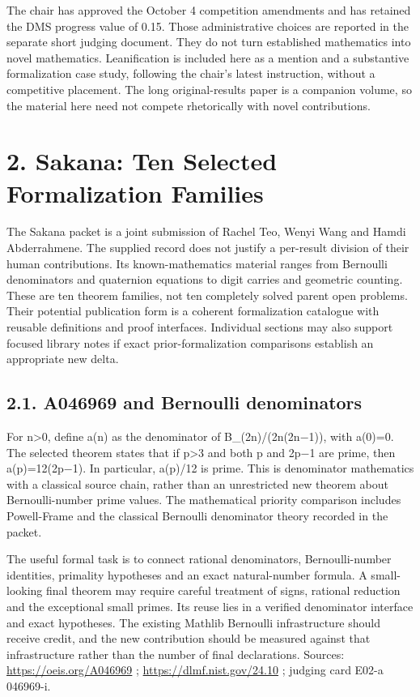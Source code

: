 \documentclass[11pt,a4paper]{article}
\begin{document}
The chair has approved the October 4 competition amendments and has retained the DMS progress value of 0.15. Those administrative choices are reported in the separate short judging document. They do not turn established mathematics into novel mathematics. Leanification is included here as a mention and a substantive formalization case study, following the chair's latest instruction, without a competitive placement. The long original-results paper is a companion volume, so the material here need not compete rhetorically with novel contributions.

\section{2. Sakana: Ten Selected Formalization Families}
The Sakana packet is a joint submission of Rachel Teo, Wenyi Wang and Hamdi Abderrahmene. The supplied record does not justify a per-result division of their human contributions. Its known-mathematics material ranges from Bernoulli denominators and quaternion equations to digit carries and geometric counting. These are ten theorem families, not ten completely solved parent open problems. Their potential publication form is a coherent formalization catalogue with reusable definitions and proof interfaces. Individual sections may also support focused library notes if exact prior-formalization comparisons establish an appropriate new delta.

\subsection{2.1. A046969 and Bernoulli denominators}
For n>0, define a(n) as the denominator of B\_(2n)/(2n(2n\ensuremath{-}1)), with a(0)=0. The selected theorem states that if p>3 and both p and 2p\ensuremath{-}1 are prime, then a(p)=12(2p\ensuremath{-}1). In particular, a(p)/12 is prime. This is denominator mathematics with a classical source chain, rather than an unrestricted new theorem about Bernoulli-number prime values. The mathematical priority comparison includes Powell-Frame and the classical Bernoulli denominator theory recorded in the packet.

The useful formal task is to connect rational denominators, Bernoulli-number identities, primality hypotheses and an exact natural-number formula. A small-looking final theorem may require careful treatment of signs, rational reduction and the exceptional small primes. Its reuse lies in a verified denominator interface and exact hypotheses. The existing Mathlib Bernoulli infrastructure should receive credit, and the new contribution should be measured against that infrastructure rather than the number of final declarations. Sources: \url{https://oeis.org/A046969} ; \url{https://dlmf.nist.gov/24.10} ; judging card E02-a 046969-i.
\end{document}
